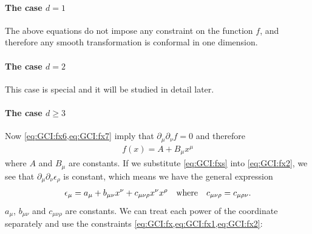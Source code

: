 \documentclass[10pt]{article}
\begin{document}
\paragraph{The case $d=1$}
The above equations do not impose any constraint on the function $f$, and therefore any smooth transformation is conformal in one dimension.
\paragraph{The case $d=2$}
This case is special and it will be studied in detail later.
\paragraph{The case $d\geq3$}
Now \cref{eq:GCI:fx6,eq:GCI:fx7} imply that $\partial_\mu\partial_\nu f=0$ and therefore
\begin{align}
    f(x)=A+B_\mu x^\mu\label{eq:GCI:fxs}
\end{align}
where $A$ and $B_\mu$ are constants.
If we substitute \cref{eq:GCI:fxs} into \cref{eq:GCI:fx2}, we see that $\partial_\mu\partial_\nu\epsilon_\rho$ is constant, which means we have the general expression
\begin{align}
    \epsilon_\mu=a_\mu+b_{\mu\nu}x^\nu+c_{\mu\nu\rho}x^\nu x^\rho\qq{where}c_{\mu\nu\rho}=c_{\mu\rho\nu}.
\end{align}
$a_\mu$, $b_{\mu\nu}$ and $c_{\mu\nu\rho}$ are constants.
We can treat each power of the coordinate separately and use the constraints \cref{eq:GCI:fx,eq:GCI:fx1,eq:GCI:fx2}:
\end{document}
